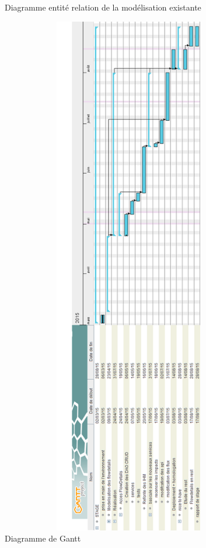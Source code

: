 \begin{figure}
\caption{Diagramme entité relation de la modélisation existante} %
\end{figure} %

\newpage
\begin{figure} %
\centering
\includegraphics[width=14cm, height=23cm]{Images/Gantt.png}
\caption{Diagramme de Gantt} %
\end{figure} %
